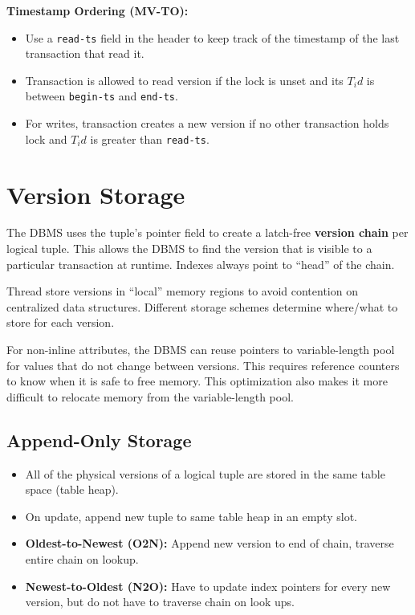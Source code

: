 \documentclass[11pt]{article}
\begin{document}
\textbf{Timestamp Ordering (MV-TO):}
\begin{itemize}
    \item
    Use a \texttt{read-ts} field in the header to keep track of the timestamp of the last 
    transaction that read it.
    
    \item
    Transaction is allowed to read version if the lock is unset and its $T_id$ is between 
    \texttt{begin-ts} and \texttt{end-ts}.
    
    \item
    For writes, transaction creates a new version if no other transaction holds lock and 
    $T_id$ is greater than \texttt{read-ts}.
\end{itemize}

\section{Version Storage}
The DBMS uses the tuple's pointer field to create a latch-free \textbf{version chain} per logical 
tuple. This allows the DBMS to find the version that is visible to a particular transaction at 
runtime. Indexes always point to ``head'' of the chain.

Thread store versions in ``local'' memory regions to avoid contention on centralized data 
structures. Different storage schemes determine where/what to store for each version.

For non-inline attributes, the DBMS can reuse pointers to variable-length pool for values that do 
not change between versions. This requires reference counters to know when it is safe to free 
memory. This optimization also makes it more difficult to relocate memory from the variable-length 
pool.
    
\subsection*{Append-Only Storage}
    \begin{itemize}
        \item
        All of the physical versions of a logical tuple are stored in the same table space 
        (table heap).
        
        \item
        On update, append new tuple to same table heap in an empty slot.
        
        \item \textbf{Oldest-to-Newest (O2N):}
        Append new version to end of chain, traverse entire chain on lookup.
        
        \item \textbf{Newest-to-Oldest (N2O):}
        Have to update index pointers for every new version, but do not have to traverse chain on 
        look ups.
\end{itemize}
\end{document}
